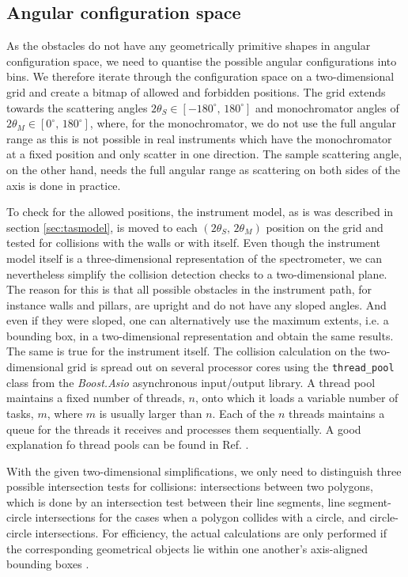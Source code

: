 \subsection{Angular configuration space}
\label{sec:angular_config_space}
As the obstacles do not have any geometrically primitive shapes in angular configuration space, we need to quantise
the possible angular configurations into bins. We therefore iterate through the configuration space on a two-dimensional 
grid and create a bitmap of allowed and forbidden positions. The grid extends towards the scattering angles 
$2\theta_S \in \left[ -180^{\circ},\, 180^{\circ} \right]$ and monochromator angles of 
$2\theta_M \in \left[0^{\circ},\, 180^{\circ} \right]$, where, for the monochromator, we do
not use the full angular range as this is not possible in real instruments which have the monochromator at a 
fixed position and only scatter in one direction. The sample scattering angle, on the other hand, needs the full 
angular range as scattering on both sides of the axis is done in practice.

To check for the allowed positions, the instrument model, as is was described in section \ref{sec:tasmodel}, is moved to
each $\left( 2\theta_S,\, 2\theta_M \right)$ position on the grid and tested for collisions with the walls or with
itself. Even though the instrument model itself is a three-dimensional representation of the spectrometer, we
can nevertheless simplify the collision detection checks to a two-dimensional plane. The reason for this is
that all possible obstacles in the instrument path, for instance walls and pillars, are upright and do not have
any sloped angles. And even if they were sloped, one can alternatively use the maximum extents, i.e. a bounding box,
in a two-dimensional representation and obtain the same results. The same is true for the instrument itself.
The collision calculation on the two-dimensional grid is spread out on several processor cores using the 
\lstinline[language=C++]|thread_pool| \cite{web_boost_asio_threadpool} class from the 
\textit{Boost.Asio} \cite{web_boost_asio} asynchronous input/output library.
A thread pool maintains a fixed number of threads, $n$, onto which it loads a variable number
of tasks, $m$, where $m$ is usually larger than $n$. Each of the $n$ threads maintains a queue for the
threads it receives and processes them sequentially. A good explanation fo thread pools can be 
found in Ref. \cite[pp. 273-299]{Williams2012}.

With the given two-dimensional simplifications, we only need to distinguish three possible 
intersection tests for collisions: intersections between two polygons, which is done by an intersection
test between their line segments, line segment-circle intersections for the cases when a polygon 
collides with a circle, and circle-circle intersections. 
For efficiency, the actual calculations are only performed if the corresponding geometrical objects lie within 
one another's axis-aligned bounding boxes \cite{web_aabb}.

